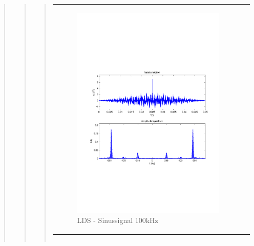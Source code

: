 \begin{quote}
\begin{quote}
\begin{quote}
\begin{center}
\begin{tabular}{ll}
                \begin{minipage}{0.6\textwidth}
                    \begin{figure}[H]
                        \includegraphics[scale=0.4, trim = 1.5cm 7cm 1.5cm 8cm, clip]
                        {./Bilder/sin100_Quantisierungsfehler_LDS}
                          \caption{LDS - Sinussignal 100kHz}
                    \end{figure}
                \end{minipage}
            
            \end{tabular}
        \end{center}
        
                \begin{center}
            \begin{tabular}{ll}
            

\end{tabular}
\end{center}
\end{quote}
\end{quote}
\end{quote}
